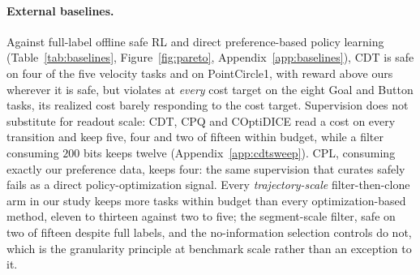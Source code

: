 \documentclass{article} %
\begin{document}
\paragraph{External baselines.} Against full-label offline safe RL and direct preference-based policy learning (Table~\ref{tab:baselines}, Figure~\ref{fig:pareto}, Appendix~\ref{app:baselines}), CDT is safe on four of the five velocity tasks and on PointCircle1, with reward above ours wherever it is safe, but violates at \emph{every} cost target on the eight Goal and Button tasks, its realized cost barely responding to the cost target. Supervision does not substitute for readout scale: CDT, CPQ and COptiDICE read a cost on every transition and keep five, four and two of fifteen within budget, while a filter consuming $200$ bits keeps twelve (Appendix~\ref{app:cdtsweep}). CPL, consuming exactly our preference data, keeps four: the same supervision that curates safely fails as a direct policy-optimization signal. Every \emph{trajectory-scale} filter-then-clone arm in our study keeps more tasks within budget than every optimization-based method, eleven to thirteen against two to five; the segment-scale filter, safe on two of fifteen despite full labels, and the no-information selection controls do not, which is the granularity principle at benchmark scale rather than an exception to it.
\end{document}
